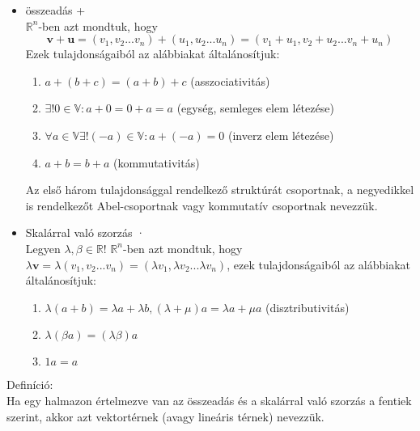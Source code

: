 \documentclass[]{scrartcl}
\providecommand{\tightlist}{%
  \setlength{\itemsep}{0pt}\setlength{\parskip}{0pt}}
\newenvironment{definicio}{}{}
\begin{document}
\begin{itemize}
\tightlist
\item
  összeadás +\\
  \({\mathbb{R}}^{n}\)-ben azt mondtuk, hogy
  \[\mathbf{v} + \mathbf{u} = \left( {v_{1},v_{2}...v_{n}} \right) + \left( {u_{1},u_{2}...u_{n}} \right) = \left( {v_{1} + u_{1},v_{2} + u_{2}...v_{n} + u_{n}} \right)\]
  Ezek tulajdonságaiból az alábbiakat általánosítjuk:

  \begin{enumerate}
  \def\labelenumi{\arabic{enumi}.}
  \tightlist
  \item
    \(a + \left( {b + c} \right) = \left( {a + b} \right) + c\)
    (asszociativitás)
  \item
    \(\exists!0 \in {\mathbb{V}}:a + 0 = 0 + a = a\) (egység, semleges
    elem létezése)
  \item
    \(\forall a \in {\mathbb{V}}\exists!( - a) \in {\mathbb{V}}:a + ( - a) = 0\)
    (inverz elem létezése)
  \item
    \(a + b = b + a\) (kommutativitás)
  \end{enumerate}

  Az első három tulajdonsággal rendelkező struktúrát csoportnak, a
  negyedikkel is rendelkezőt Abel-csoportnak vagy kommutatív csoportnak
  nevezzük.
\item
  Skalárral való szorzás ·\\
  Legyen \(\lambda,\beta \in {\mathbb{R}}\)! \({\mathbb{R}}^{n}\)-ben
  azt mondtuk, hogy
  \(\lambda\mathbf{v} = \lambda\left( {v_{1},v_{2}...v_{n}} \right) = \left( {\lambda v_{1},\lambda v_{2}...\lambda v_{n}} \right)\),
  ezek tulajdonságaiból az alábbiakat általánosítjuk:

  \begin{enumerate}
  \def\labelenumi{\arabic{enumi}.}
  \tightlist
  \item
    \(\lambda\left( {a + b} \right) = \lambda a + \lambda b,\left( {\lambda + \mu} \right)a = \lambda a + \mu a\)
    (disztributivitás)
  \item
    \(\lambda\left( {\beta a} \right) = \left( {\lambda\beta} \right)a\)
  \item
    \(1a = a\)
  \end{enumerate}
\end{itemize}

\begin{definicio}

Definíció:\\
Ha egy halmazon értelmezve van az összeadás és a skalárral való szorzás
a fentiek szerint, akkor azt vektortérnek (avagy lineáris térnek)
nevezzük.

\end{definicio}
\end{document}
